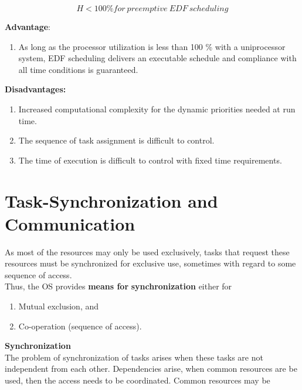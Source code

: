 \begin{equation}
	H \mathrm{<} 100 \% for\ preemptive\ EDF\ scheduling
\label{EQ }
\end{equation}

\textbf{Advantage}: 

\begin{enumerate}
\item  As long as the processor utilization is less than 100 \% with a uniprocessor system, EDF  scheduling delivers an executable schedule and compliance with all time conditions is guaranteed.
\end{enumerate}

\textbf{Disadvantages:}

\begin{enumerate}
\item Increased computational complexity for the dynamic priorities needed at run time.

\item The sequence of task assignment is difficult to control.

\item The time of execution is difficult to control with fixed time requirements.
\end{enumerate}
\newpage

\section{Task-Synchronization and Communication}

As most of the resources may only be used exclusively, tasks that request these resources must be synchronized for exclusive use, sometimes with regard to some sequence of access. \\

Thus, the OS provides \textbf{means for} \textbf{synchronization} either for 

\begin{enumerate}
\item  Mutual exclusion, and 
\item  Co-operation (sequence of access).
\end{enumerate}
\os{\newpage}
{\rot\bf Synchronization }\\

The problem of synchronization of tasks arises when these tasks are not independent from each other. Dependencies arise, when common resources are be used, then the access needs to be coordinated. Common resources may be

